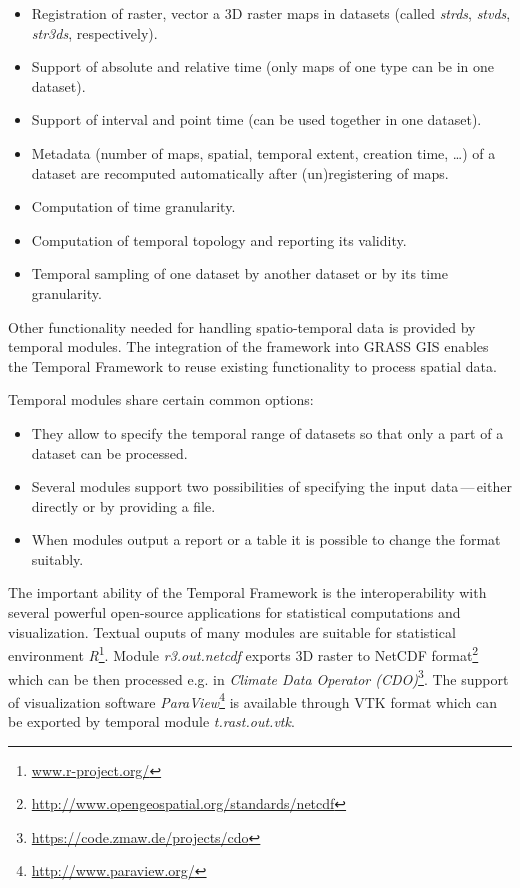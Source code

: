 \documentclass[a4paper,12pt,oneside]{book}
\newcommand{\module}[1]{\textsl{#1}}
\newcommand{\tf}{Temporal Framework\xspace}
\newcommand{\dash}{\mbox{\,---\,}}
\begin{document}
\begin{itemize}
    \item Registration of raster, vector a 3D raster maps in datasets (called \emph{strds}, \emph{stvds}, \emph{str3ds}, respectively).
    \item Support of absolute and relative time (only maps of one type can be in one dataset).
    \item Support of interval and point time (can be used together in one dataset).
    \item Metadata (number of maps, spatial, temporal extent, creation time, \ldots) of a dataset
    are recomputed automatically after (un)registering of maps.
    \item Computation of time granularity.
    \item Computation of temporal topology and reporting its validity.
    \item Temporal sampling of one dataset by another dataset or by its time granularity.
\end{itemize}

Other functionality needed for handling spatio-temporal data is provided by temporal modules.
The integration of the framework into GRASS GIS enables the \tf to reuse existing
functionality to process spatial data.

Temporal modules share certain common options:
\begin{itemize}
  \item They allow to specify the temporal range of datasets so that only a part of a dataset can be processed.
  \item Several modules support two possibilities of specifying the input data\dash either directly or by providing a file.
  \item When modules output a report or a table it is possible to change the format suitably.
\end{itemize}

The important ability of the \tf is the interoperability
with several powerful open-source applications for statistical computations and visualization.
Textual ouputs of many modules are suitable for statistical environment \emph{R}\footnote{\url{www.r-project.org/}}.
Module \module{r3.out.netcdf} exports 3D raster to NetCDF
format\footnote{\url{http://www.opengeospatial.org/standards/netcdf}}
which can be then processed e.g. in \emph{Climate Data Operator (CDO)}\footnote{\url{https://code.zmaw.de/projects/cdo}}.
The support of visualization software \emph{ParaView}\footnote{\url{http://www.paraview.org/}} is available
through VTK format which can be exported by temporal module \module{t.rast.out.vtk}.
\end{document}
